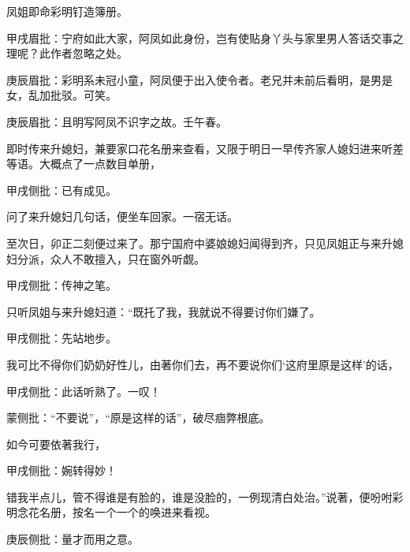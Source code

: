 \begin{parag}
    凤姐即命彩明钉造簿册。\begin{note}甲戌眉批：宁府如此大家，阿凤如此身份，岂有使贴身丫头与家里男人答话交事之理呢？此作者忽略之处。\end{note}\begin{note}庚辰眉批：彩明系未冠小童，阿凤便于出入使令者。老兄并未前后看明，是男是女，乱加批驳。可笑。\end{note}\begin{note}庚辰眉批：且明写阿凤不识字之故。壬午春。\end{note}即时传来升媳妇，兼要家口花名册来查看，又限于明日一早传齐家人媳妇进来听差等语。大概点了一点数目单册，\begin{note}甲戌侧批：已有成见。\end{note}问了来升媳妇几句话，便坐车回家。一宿无话。
\end{parag}


\begin{parag}
    至次日，卯正二刻便过来了。那宁国府中婆娘媳妇闻得到齐，只见凤姐正与来升媳妇分派，众人不敢擅入，只在窗外听觑。\begin{note}甲戌侧批：传神之笔。\end{note}只听凤姐与来升媳妇道：“既托了我，我就说不得要讨你们嫌了。\begin{note}甲戌侧批：先站地步。\end{note}我可比不得你们奶奶好性儿，由著你们去，再不要说你们‘这府里原是这样’的话，\begin{note}甲戌侧批：此话听熟了。一叹！\end{note}\begin{note}蒙侧批：“不要说”，“原是这样的话”，破尽痼弊根底。\end{note}如今可要依著我行，\begin{note}甲戌侧批：婉转得妙！\end{note}错我半点儿，管不得谁是有脸的，谁是没脸的，一例现清白处治。”说著，便吩咐彩明念花名册，按名一个一个的唤进来看视。\begin{note}庚辰侧批：量才而用之意。\end{note}
\end{parag}



